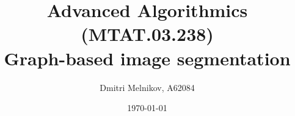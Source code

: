 \documentclass[a4paper]{article}
\title{Advanced Algorithmics (MTAT.03.238) \\
       Graph-based image segmentation}
\author{Dmitri Melnikov, A62084}
\date{\today}
\begin{document}
\maketitle
\pagebreak

\end{document}
